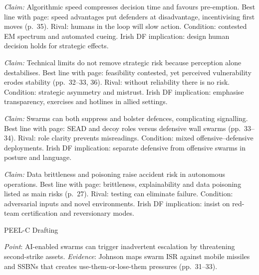 \textit{Claim:} Algorithmic speed compresses decision time and favours pre-emption.
Best line with page: speed advantages put defenders at disadvantage, incentivising first moves (p.~35). Rival: humans in the loop will slow action. Condition: contested EM spectrum and automated cueing. Irish DF implication: design human decision holds for strategic effects.

\textit{Claim:} Technical limits do not remove strategic risk because perception alone destabilises.
Best line with page: feasibility contested, yet perceived vulnerability erodes stability (pp.~32–33, 36). Rival: without reliability there is no risk. Condition: strategic asymmetry and mistrust. Irish DF implication: emphasise transparency, exercises and hotlines in allied settings.

\textit{Claim:} Swarms can both suppress and bolster defences, complicating signalling.
Best line with page: SEAD and decoy roles versus defensive wall swarms (pp.~33–34). Rival: role clarity prevents misreadings. Condition: mixed offensive–defensive deployments. Irish DF implication: separate defensive from offensive swarms in posture and language.

\textit{Claim:} Data brittleness and poisoning raise accident risk in autonomous operations.
Best line with page: brittleness, explainability and data poisoning listed as main risks (p.~27). Rival: testing can eliminate failure. Condition: adversarial inputs and novel environments. Irish DF implication: insist on red-team certification and reversionary modes.

PEEL-C Drafting

\textit{Point}: AI-enabled swarms can trigger inadvertent escalation by threatening second-strike assets.
\textit{Evidence}: Johnson maps swarm ISR against mobile missiles and SSBNs that creates use-them-or-lose-them pressures (pp.~31–33).

\parencite{OYEWOLE_2025}
